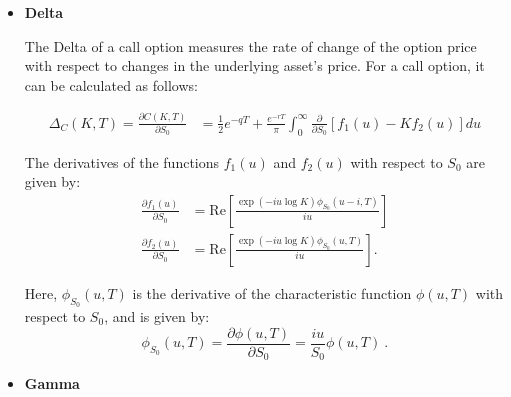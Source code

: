 \begin{itemize}

\item \textbf{Delta} 

The Delta of a call option measures the rate of change of the option price with respect to changes in the underlying asset's price. For a call option, it can be calculated as follows:

$$
\begin{aligned}
\Delta_C(K,T) = \frac{ \partial C(K,T) }{\partial S_0} &=
 \frac{1}{2}e^{-q T} + \frac{e^{-r T}}{\pi} \int_0^{\infty}\frac{ \partial  }{\partial S_0}  \left[f_1(u) - Kf_2(u)\right]du
\end{aligned}
$$

The derivatives of the functions $f_1(u)$ and $f_2(u)$ with respect to $S_0$ are given by:
\begin{equation}
\label{eq:derivative-s0-f1-f2}
\begin{aligned}
\frac{ \partial  f_1(u)   }{\partial S_0}&= \mathrm{Re}\left[  \frac{\exp(-iu\log K) \phi_{S_0}(u-i,T)   }{iu}\right]   \\  
\frac{\partial f_2(u)   }{\partial S_0} &= \mathrm{Re}\left[ \frac{\exp(-iu\log K) \phi_{S_0}(u,T)  }{iu}\right].
\end{aligned}
\end{equation}

Here, $\phi_{S_0}(u,T)$ is the derivative of the characteristic function $\phi(u,T)$ with respect to $S_0$, and is given by:
$$
\phi_{S_0}(u,T) = \frac{ \partial  \phi(u,T)}{\partial S_0} = \frac{iu}{S_0} \phi(u,T) \ . 
$$


\item \textbf{Gamma} 


\end{itemize}
